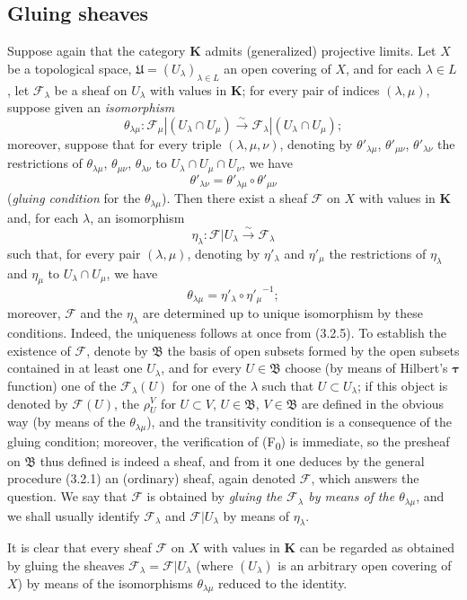 \subsection{Gluing sheaves}
\label{subsection:0.3.3}

\begin{env}[3.3.1]
\label{0.3.3.1}
Suppose again that the category $\boldsymbol{K}$ admits (generalized) projective limits.
Let $X$ be a topological space,
$\mathfrak{U}=(U_\lambda)_{\lambda\in L}$ an open covering of $X$, and
for each $\lambda\in L$, let $\mathcal{F}_\lambda$ be a sheaf on
$U_\lambda$ with values in $\boldsymbol{K}$; for every pair of indices
$(\lambda,\mu)$, suppose given an \emph{isomorphism}
\[
  \theta_{\lambda\mu}:
  \mathcal{F}_\mu|(U_\lambda\cap U_\mu)
  \xrightarrow{\sim}
  \mathcal{F}_\lambda|(U_\lambda\cap U_\mu);
\]
moreover, suppose that for every triple $(\lambda,\mu,\nu)$, denoting by
$\theta'_{\lambda\mu}$, $\theta'_{\mu\nu}$, $\theta'_{\lambda\nu}$ the
restrictions of $\theta_{\lambda\mu}$, $\theta_{\mu\nu}$,
$\theta_{\lambda\nu}$ to $U_\lambda\cap U_\mu\cap U_\nu$, we have
\[
  \theta'_{\lambda\nu}
  =\theta'_{\lambda\mu}\circ\theta'_{\mu\nu}
\]
(\emph{gluing condition} for the $\theta_{\lambda\mu}$). Then there
exist a sheaf $\mathcal{F}$ on $X$ with values in $\boldsymbol{K}$ and, for
each $\lambda$, an isomorphism
\[
  \eta_\lambda:\mathcal{F}|U_\lambda\xrightarrow{\sim}\mathcal{F}_\lambda
\]
such that, for every pair $(\lambda,\mu)$, denoting by
$\eta'_\lambda$ and $\eta'_\mu$ the restrictions of $\eta_\lambda$ and
$\eta_\mu$ to $U_\lambda\cap U_\mu$, we have
\[
  \theta_{\lambda\mu}=\eta'_\lambda\circ{\eta'_\mu}^{-1};
\]
moreover, $\mathcal{F}$ and the $\eta_\lambda$ are determined up to unique
isomorphism by these conditions. Indeed, the uniqueness follows
at once from (3.2.5). To establish the existence of $\mathcal{F}$, denote by
$\mathfrak{B}$ the basis of open subsets formed by the open subsets contained in at least one
$U_\lambda$, and for every $U\in\mathfrak{B}$ choose (by means of Hilbert's
$\boldsymbol{\tau}$ function) one of the $\mathcal{F}_\lambda(U)$ for one of the
$\lambda$ such that $U\subset U_\lambda$; if this object is denoted by
$\mathcal{F}(U)$, the $\rho_U^V$ for $U\subset V$, $U\in\mathfrak{B}$,
$V\in\mathfrak{B}$ are defined in the obvious way (by means of the
$\theta_{\lambda\mu}$), and the transitivity condition is a consequence of the
gluing condition; moreover, the verification of
(F\textsubscript{0}) is immediate, so the presheaf on $\mathfrak{B}$
thus defined is indeed a sheaf, and from it one deduces by the general procedure
(3.2.1) an (ordinary) sheaf, again denoted $\mathcal{F}$, which answers the
question. We say that $\mathcal{F}$ is obtained by \emph{gluing the
$\mathcal{F}_\lambda$ by means of the $\theta_{\lambda\mu}$}, and we shall usually
identify $\mathcal{F}_\lambda$ and $\mathcal{F}|U_\lambda$ by means of
$\eta_\lambda$.

It is clear that every sheaf $\mathcal{F}$ on $X$ with values in
$\boldsymbol{K}$ can be regarded as obtained by gluing the sheaves
$\mathcal{F}_\lambda=\mathcal{F}|U_\lambda$ (where $(U_\lambda)$ is an
arbitrary open covering of $X$) by means of the isomorphisms
$\theta_{\lambda\mu}$ reduced to the identity.
\end{env}

